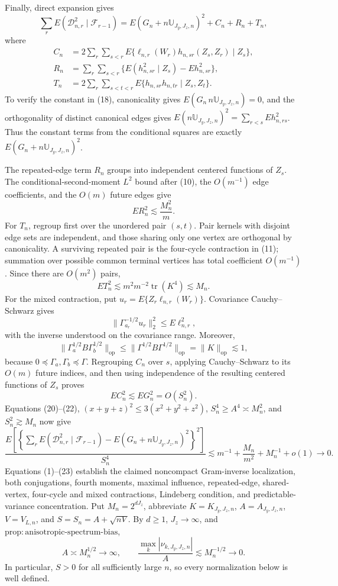Finally, direct expansion gives
\[
\sum_rE(\mathcal D_{n,r}^2\mid\mathcal F_{r-1})
=E(G_n+n\mathbb U_{J_y,J_z,n})^2+C_n+R_n+T_n, \tag{18}
\]
where
\[
\begin{split}
C_n&=2\sum_r\sum_{s<r}E\{\ell_{n,r}(W_r)h_{n,sr}(Z_s,Z_r)\mid Z_s\},\\
R_n&=\sum_r\sum_{s<r}\{E(h_{n,sr}^2\mid Z_s)-Eh_{n,sr}^2\},\\
T_n&=2\sum_r\sum_{s<t<r}E\{h_{n,sr}h_{n,tr}\mid Z_s,Z_t\}.
\end{split} \tag{19}
\]
To verify the constant in (18), canonicality gives \(E(G_n\,n\mathbb U_{J_y,J_z,n})=0\), and the orthogonality of distinct canonical edges gives \(E(n\mathbb U_{J_y,J_z,n})^2=\sum_{r<s}Eh_{n,rs}^2\). Thus the constant terms from the conditional squares are exactly \(E(G_n+n\mathbb U_{J_y,J_z,n})^2\).

The repeated-edge term \(R_n\) groups into independent centered functions of \(Z_s\). The conditional-second-moment \(L^2\) bound after (10), the \(O(m^{-1})\) edge coefficients, and the \(O(m)\) future edges give
\[
ER_n^2\lesssim\frac{M_n^2}{m}. \tag{20}
\]
For \(T_n\), regroup first over the unordered pair \((s,t)\). Pair kernels with disjoint edge sets are independent, and those sharing only one vertex are orthogonal by canonicality. A surviving repeated pair is the four-cycle contraction in (11); summation over possible common terminal vertices has total coefficient \(O(m^{-1})\). Since there are \(O(m^2)\) pairs,
\[
ET_n^2\lesssim m^2m^{-2}\operatorname{tr}(K^4)\lesssim M_n. \tag{21}
\]
For the mixed contraction, put \(u_r=E\{Z_r\ell_{n,r}(W_r)\}\). Covariance Cauchy--Schwarz gives
\[
\|\Gamma_{a_r}^{-1/2}u_r\|_2^2\le E\ell_{n,r}^2,
\]
with the inverse understood on the covariance range. Moreover,
\[
\|\Gamma_a^{1/2}B\Gamma_b^{1/2}\|_{\mathrm{op}}
\le\|\Gamma^{1/2}B\Gamma^{1/2}\|_{\mathrm{op}}
=\|K\|_{\mathrm{op}}\lesssim1,
\]
because \(0\preceq\Gamma_a,\Gamma_b\preceq\Gamma\). Regrouping \(C_n\) over \(s\), applying Cauchy--Schwarz to its \(O(m)\) future indices, and then using independence of the resulting centered functions of \(Z_s\) proves
\[
EC_n^2\lesssim EG_n^2=O(S_n^2). \tag{22}
\]
Equations (20)--(22), \((x+y+z)^2\le3(x^2+y^2+z^2)\), \(S_n^4\ge A^4\asymp M_n^2\), and \(S_n^2\gtrsim M_n\) now give
\[
\frac{E\left[\left\{\sum_rE(\mathcal D_{n,r}^2\mid\mathcal F_{r-1})
-E(G_n+n\mathbb U_{J_y,J_z,n})^2\right\}^2\right]}{S_n^4}
\lesssim m^{-1}+\frac{M_n}{m^2}+M_n^{-1}+o(1)\longrightarrow0. \tag{23}
\]
Equations (1)--(23) establish the claimed noncompact Gram-inverse localization, both conjugations, fourth moments, maximal influence, repeated-edge, shared-vertex, four-cycle and mixed contractions, Lindeberg condition, and predictable-variance concentration.
Put \(M_n=2^{dJ_z}\), abbreviate \(K=K_{J_y,J_z,n}\), \(A=A_{J_y,J_z,n}\), \(V=V_{L,n}\), and \(S=S_n=A+\sqrt{nV}\). By \(d\ge1\), \(J_z\to\infty\), and \(\mathrm{prop{:}anisotropic\text{-}spectrum\text{-}bias}\),
\[
A\asymp M_n^{1/2}\longrightarrow\infty,
\qquad
\frac{\max_k|\nu_{k,J_y,J_z,n}|}{A}
\lesssim M_n^{-1/2}\longrightarrow0. \tag{1}
\]
In particular, \(S>0\) for all sufficiently large \(n\), so every normalization below is well defined.


